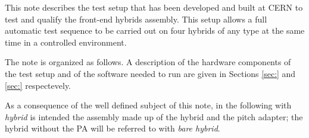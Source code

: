 This note describes the test setup that has been developed and built
at CERN to test and qualify the front-end hybrids assembly.
This setup allows a full automatic test sequence to be carried out on
four hybrids of any type at the same time in a controlled environment.

The note is organized as follows. A description of the hardware components of the test setup and of the software needed to run are given in Sections \ref{sec:} and \ref{sec:} respectevely.

As a consequence of the well defined subject of this note, in the following with {\em hybrid} is intended the assembly made up of the hybrid and the pitch adapter; the hybrid without the PA will be referred to with {\em bare hybrid}.